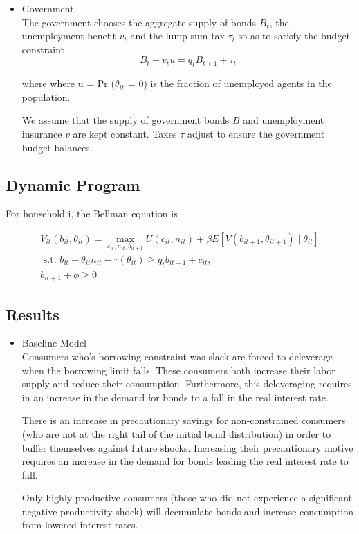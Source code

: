 \documentclass[./GL2017.tex]{subfiles}
\begin{document}
\begin{itemize}
\item{Government}\\
The government chooses the aggregate supply of bonds $B_{t}$, the unemployment benefit $v_{t}$ and the lump sum tax $\tau_{t}$ so as to satisfy the budget constraint
\begin{equation}
B_{t}+v_{t} u=q_{t} B_{t+1}+\tau_{t}
\end{equation}

where where u = Pr ($\theta_{it}$ = 0) is the fraction of unemployed agents in the population.

We assume that the supply of government bonds $B$ and unemployment insurance $v$ are kept constant.
Taxes $\tau$ adjust to ensure the government budget balances.


\end{itemize}



\subsection{Dynamic Program}

For household i, the Bellman equation is


\begin{align}
V_{it}(b_{it}, \theta_{it})=\max _{c_{it}, n_{it}, b_{it+1}} U(c_{it}, n_{it})+\beta E\left[V\left(b_{it+1}, \theta_{it+1}\right) \mid \theta_{it}\right] \\
\text { s.t. }  b_{it}+\theta_{it} n_{it} -\tau(\theta_{it}) \geq q_{t} b_{it+1}+c_{it}, \\
b_{it+1}+\phi \geq 0
\end{align}

\subsection{Results}
\begin{itemize}
\item{Baseline Model}\\
Consumers who's borrowing constraint was slack are forced to deleverage when the borrowing limit falls. These consumers both increase their labor supply and reduce their consumption. Furthermore, this deleveraging requires in an increase in  the demand for bonds to a fall in the real interest rate.

There is an increase in precautionary savings for non-constrained consumers (who are not at the right tail of the initial bond distribution) in order to buffer themselves against future shocks. Increasing their precautionary motive requires an increase in the demand for bonds leading the real interest rate to fall.

Only highly productive consumers (those who did not experience a significant negative productivity shock) will decumulate bonds and increase consumption from lowered interest rates.

\end{itemize}
\end{document}

